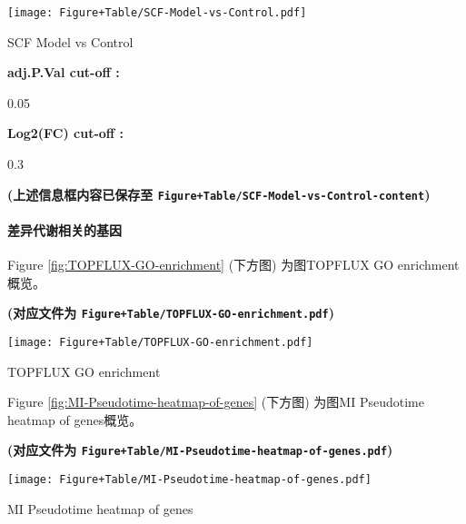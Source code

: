 \documentclass[
]{article}
\begin{document}
\def\@captype{figure}
\begin{center}
\texttt{[image: Figure+Table/SCF-Model-vs-Control.pdf]}
\caption{SCF Model vs Control}\label{fig:SCF-Model-vs-Control}
\end{center}
\begin{center}\begin{tcolorbox}[colback=gray!10, colframe=gray!50, width=0.9\linewidth, arc=1mm, boxrule=0.5pt]
\textbf{
adj.P.Val cut-off
:}

\vspace{0.5em}

    0.05

\vspace{2em}


\textbf{
Log2(FC) cut-off
:}

\vspace{0.5em}

    0.3

\vspace{2em}
\end{tcolorbox}
\end{center}

\textbf{(上述信息框内容已保存至 \texttt{Figure+Table/SCF-Model-vs-Control-content})}

\hypertarget{ux5deeux5f02ux4ee3ux8c22ux76f8ux5173ux7684ux57faux56e0}{%
\paragraph{差异代谢相关的基因}\label{ux5deeux5f02ux4ee3ux8c22ux76f8ux5173ux7684ux57faux56e0}}

Figure \ref{fig:TOPFLUX-GO-enrichment} (下方图) 为图TOPFLUX GO enrichment概览。

\textbf{(对应文件为 \texttt{Figure+Table/TOPFLUX-GO-enrichment.pdf})}

\def\@captype{figure}
\begin{center}
\texttt{[image: Figure+Table/TOPFLUX-GO-enrichment.pdf]}
\caption{TOPFLUX GO enrichment}\label{fig:TOPFLUX-GO-enrichment}
\end{center}

Figure \ref{fig:MI-Pseudotime-heatmap-of-genes} (下方图) 为图MI Pseudotime heatmap of genes概览。

\textbf{(对应文件为 \texttt{Figure+Table/MI-Pseudotime-heatmap-of-genes.pdf})}

\def\@captype{figure}
\begin{center}
\texttt{[image: Figure+Table/MI-Pseudotime-heatmap-of-genes.pdf]}
\caption{MI Pseudotime heatmap of genes}\label{fig:MI-Pseudotime-heatmap-of-genes}
\end{center}
\end{document}
